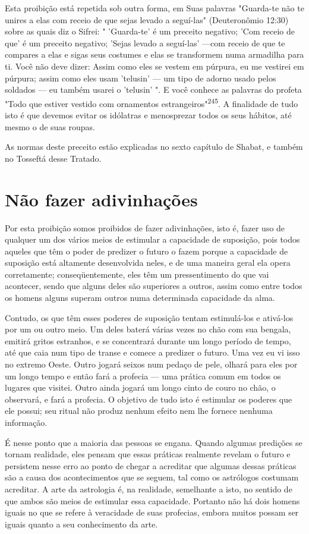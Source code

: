 \begin{itemize}
\begin{enumrate}
\begin{itemize}
\begin{itemize}
\begin{itemize}
Esta proibição está repetida sob outra forma, em Suas palavras
"Guarda-te não te unires a elas com receio de que sejas levado a
seguí-las" (Deu­teronômio 12:30) sobre as quais diz o Sifrei: "
'Guarda-te' é um preceito nega­tivo; 'Com receio de que' é um preceito
negativo; 'Sejas levado a seguí-las' ---com receio de que te compares a
elas e sigas seus costumes e elas se transfor­mem numa armadilha para
ti. Você não deve dizer: Assim como eles se vestem em púrpura, eu me
vestirei em púrpura; assim como eles usam 'telusin' --- um tipo de
adorno usado pelos soldados --- eu também usarei o 'telusin' ". E você
conhece as palavras do profeta "Todo que estiver vestido com ornamentos
es­trangeiros"\textsuperscript{245}. A finalidade de tudo isto é que
devemos evitar os idólatras e menosprezar todos os seus hábitos, até
mesmo o de suas roupas.

As normas deste preceito estão explicadas no sexto capítulo de Sha­bat,
e também no Tosseftá desse Tratado.

\section{Não fazer adivinhações}

Por esta proibição somos proibidos de fazer adivinhações, isto é, fa­zer
uso de qualquer um dos vários meios de estimular a capacidade de
suposi­ção, pois todos aqueles que têm o poder de predizer o futuro o
fazem porque a capacidade de suposição está altamente desenvolvida
neles, e de uma manei­ra geral ela opera corretamente; conseqüentemente,
eles têm um pressentimento do que vai acontecer, sendo que alguns deles
são superiores a outros, assim como entre todos os homens alguns superam
outros numa determinada capa­cidade da alma.

Contudo, os que têm esses poderes de suposição tentam estimulá-los e
ativá-los por um ou outro meio. Um deles baterá várias vezes no chão com
sua bengala, emitirá gritos estranhos, e se concentrará durante um longo
perío­do de tempo, até que caia num tipo de transe e comece a predizer o
futuro. Uma vez eu vi isso no extremo Oeste. Outro jogará seixos num
pedaço de pele, olhará para eles por um longo tempo e então fará a
profecia --- uma prática co­mum em todos os lugares que visitei. Outro
ainda jogará um longo cinto de couro no chão, o observará, e fará a
profecia. O objetivo de tudo isto é estimu­lar os poderes que ele
possui; seu ritual não produz nenhum efeito nem lhe fornece nenhuma
informação.

É nesse ponto que a maioria das pessoas se engana. Quando algumas
predições se tornam realidade, eles pensam que essas práticas realmente
reve­lam o futuro e persistem nesse erro ao ponto de chegar a acreditar
que algumas dessas práticas são a causa dos acontecimentos que se
seguem, tal como os as­trólogos costumam acreditar. A arte da astrologia
é, na realidade, semelhante a isto, no sentido de que ambos são meios de
estimular essa capacidade. Portanto não há 
dois homens iguais no que se refere à veracidade de suas
profe­cias, embora muitos possam ser iguais quanto a seu conhecimento da
arte.


\end{itemize}
\end{itemize}
\end{itemize}
\end{enumrate}
\end{itemize}
